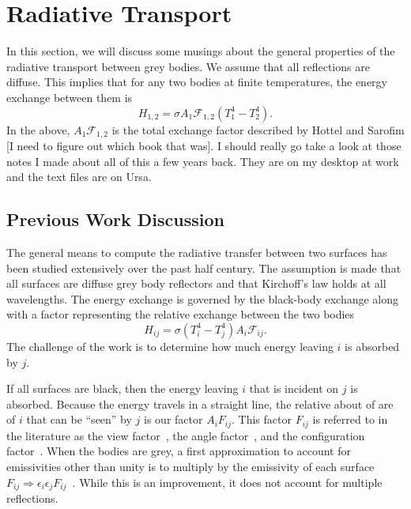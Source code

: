 \section{Radiative Transport}
In this section, we will discuss some musings about the general
properties of the radiative transport between grey bodies.  We assume
that all reflections are diffuse.  This implies that for any two bodies
at finite temperatures, the energy exchange between them is 
\begin{equation}
    H_{1,2} = \sigma A_1\mathcal{F}_{1,2} \left(T_1^4 -T_2^4\right).
\end{equation}
In the above, \(A_1\mathcal{F}_{1,2}\) is the total exchange factor 
described by Hottel and Sarofim [I need to figure out which book that
was].  I should really go take a look at those notes I made about all of
this a few years back.  They are on my desktop at work and the text
files are on Ursa.

\subsection{Previous Work Discussion}
The general means to compute the radiative transfer between two surfaces
has been studied extensively over the past half century.  The assumption
is made that all surfaces are diffuse grey body reflectors and that
Kirchoff's law holds at all wavelengths.  The energy exchange is
governed by the black-body exchange along with a factor representing the
relative exchange between the two bodies
\begin{equation}
    H_{ij} = \sigma(T_i^4 -T_j^4) A_i\mathcal{F}_{ij}.
\end{equation}
The challenge of the work is to determine how much energy leaving \(i\)
is absorbed by \(j\).  

If all surfaces are black, then the energy leaving \(i\) that is
incident on \(j\) is absorbed.  Because the energy travels in a straight
line, the relative about of are of \(i\) that can be ``seen'' by \(j\)
is our factor \(A_iF_{ij}\).  This factor \(F_{ij}\) is referred to in
the literature as the view factor~\cite{clark_algebraic_1974,
hottel_radiative_1967}, the angle factor~\cite{hottel_radiative_1967,
sparrow_new_1963}, and the configuration
factor~\cite{eichberger_calculation_1985}.  When the bodies are grey, a
first approximation to account for emissivities other than unity is to
multiply by the emissivity of each surface
\(F_{ij}\Rightarrow\epsilon_i\epsilon_j
F_{ij}\)~\cite{eichberger_calculation_1985}.  While this is an
improvement, it does not account for multiple reflections.


